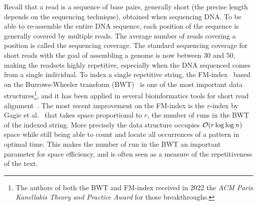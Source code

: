 Recall that a read is a sequence of base pairs, generally short (the precise length depends on the sequencing technique), obtained when sequencing DNA. To be able to re-assemble the entire DNA sequence, each position of the sequence is generally covered by multiple reads. The average number of reads covering a position is called the sequencing coverage.
The standard sequencing coverage for short reads with the goal of assembling a genome is now between $30$ and $50$, making the readsets highly repetitive, especially when the DNA sequenced comes from a single individual.
To index a single repetitive string, the FM-index~\cite{ferragina2005indexing} based on the Burrows-Wheeler transform (BWT)~\cite{burrows1994block} is one of the most important data structures\footnote{The authors of both the BWT and FM-index received in 2022 the \textit{ACM Paris Kanellakis Theory and Practice Award} for those breakthroughs.}, and it has been applied in several bioinformatics tools for short read alignment~\cite{langmead2009ultrafast,langmead2012fast,li2009fast}.
The most recent improvement on the FM-index is  the $r$-index by Gagie et al.~\cite{gagie2020fully} that takes space proportional to $r$, the number of runs in the BWT of the indexed string. More precisely the data structure occupies $\mathcal{O}(r\log\log n)$ space while still being able to count and locate all occurrences of a pattern in optimal time. This makes the number of run in the BWT an important parameter for space efficiency, and is often seen as a measure of the repetitiveness of the text.

